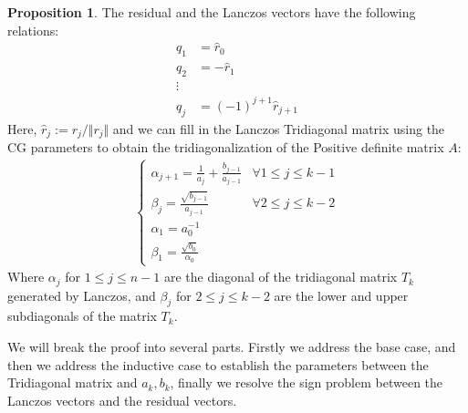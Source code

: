 \documentclass[]{article}
\theoremstyle{definition}
\newtheorem{prop}{Proposition}[section]  %
\begin{document}
        \begin{prop}
            The residual and the Lanczos vectors have the following relations: 
            \begin{align}
                q_1 &= \hat r_0\\
                q_2 &= -\hat r_1
                \\
                \vdots
                \\
                q_j &= (-1)^{j + 1}\hat r_{j + 1}
            \end{align}
            Here, $\hat{r}_j:= r_j/\Vert r_j\Vert$ and we can fill in the Lanczos Tridiagonal matrix using the CG parameters to obtain the tridiagonalization of the Positive definite matrix $A$: 
            \begin{align}
                \begin{cases}
                    \alpha_{j + 1} = \frac{1}{a_j} + \frac{b_{j - 1}}{a_{j - 1}}
                    & \forall 1 \le j \le k - 1
                    \\
                    \beta_{j} = \frac{\sqrt{b_{j - 1}}}{a_{j - 1}}
                    & \forall 2 \le j \le k - 2 
                    \\
                    \alpha_1 = a_0^{-1} & 
                    \\
                    \beta_1 = \frac{\sqrt{b_0}}{\alpha_0}
                \end{cases}
            \end{align}
            Where $\alpha_j$ for $1\le j \le n - 1$ are the diagonal of the tridiagonal matrix $T_k$ generated by Lanczos, and $\beta_j$ for $2\le j \le k - 2$ are the lower and upper subdiagonals of the matrix $T_k$. 
        \end{prop}
        We will break the proof into several parts. Firstly we address the base case, and then we address the inductive case to establish the parameters between the Tridiagonal matrix and $a_k, b_k$, finally we resolve the sign problem between the Lanczos vectors and the residual vectors. 
\end{document}
